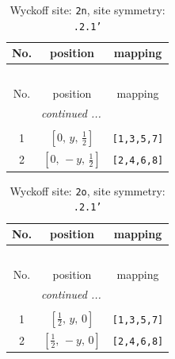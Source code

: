 \documentclass[fleqn,8pt]{jsarticle}
\begin{document}
\begin{longtable}{ccc}
\caption{Wyckoff site: {\tt 2n}, site symmetry: {\tt .2.1'}}
 \\
 \hline \hline
No. & position & mapping \\ \hline \endfirsthead

\multicolumn{2}{l}{\tablename\ \thetable{}} \\
 \hline \hline
No. & position & mapping \\ \hline \endhead

 \hline \hline
\multicolumn{2}{r}{\footnotesize\it continued ...} \\ \endfoot

 \hline \hline
\multicolumn{2}{r}{} \\ \endlastfoot

1 & $\left[ 0,\, y,\, \frac{1}{2} \right]$ & {\tt [1,3,5,7]} \\ \hline
2 & $\left[ 0,\, - y,\, \frac{1}{2} \right]$ & {\tt [2,4,6,8]} \\
\end{longtable}
\renewcommand{\arraystretch}{1.2}
\begin{longtable}{ccc}
\caption{Wyckoff site: {\tt 2o}, site symmetry: {\tt .2.1'}}
 \\
 \hline \hline
No. & position & mapping \\ \hline \endfirsthead

\multicolumn{2}{l}{\tablename\ \thetable{}} \\
 \hline \hline
No. & position & mapping \\ \hline \endhead

 \hline \hline
\multicolumn{2}{r}{\footnotesize\it continued ...} \\ \endfoot

 \hline \hline
\multicolumn{2}{r}{} \\ \endlastfoot

1 & $\left[ \frac{1}{2},\, y,\, 0 \right]$ & {\tt [1,3,5,7]} \\ \hline
2 & $\left[ \frac{1}{2},\, - y,\, 0 \right]$ & {\tt [2,4,6,8]} \\
\end{longtable}
\renewcommand{\arraystretch}{1.2}
\end{document}
